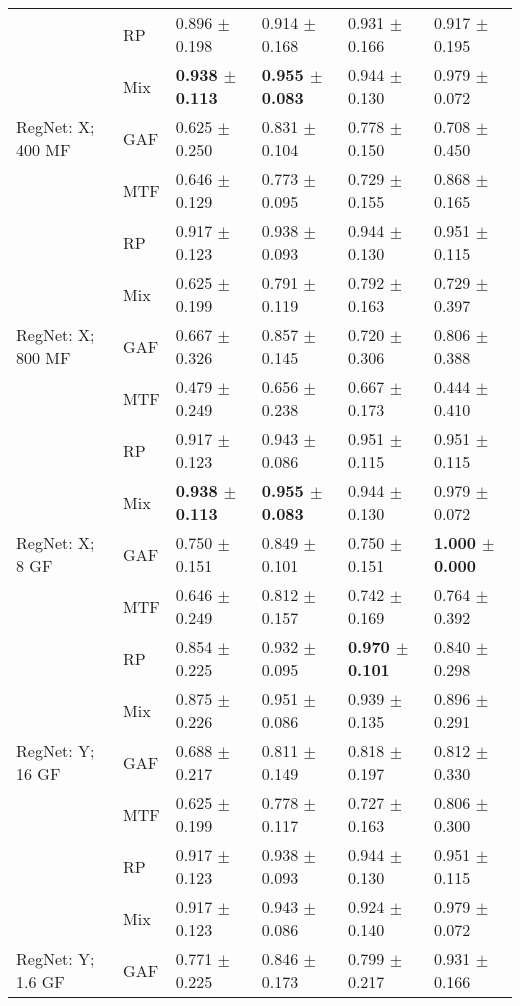 \begin{longtable}[t]{llllll}
 & RP & 0.896 $\pm$ 0.198 & 0.914 $\pm$ 0.168 & 0.931 $\pm$ 0.166 & 0.917 $\pm$ 0.195 \\
 & Mix & \textbf{0.938 $\pm$ 0.113} & \textbf{0.955 $\pm$ 0.083} & 0.944 $\pm$ 0.130 & 0.979 $\pm$ 0.072 \\
RegNet: X; 400 MF & GAF & 0.625 $\pm$ 0.250 & 0.831 $\pm$ 0.104 & 0.778 $\pm$ 0.150 & 0.708 $\pm$ 0.450 \\
 & MTF & 0.646 $\pm$ 0.129 & 0.773 $\pm$ 0.095 & 0.729 $\pm$ 0.155 & 0.868 $\pm$ 0.165 \\
 & RP & 0.917 $\pm$ 0.123 & 0.938 $\pm$ 0.093 & 0.944 $\pm$ 0.130 & 0.951 $\pm$ 0.115 \\
 & Mix & 0.625 $\pm$ 0.199 & 0.791 $\pm$ 0.119 & 0.792 $\pm$ 0.163 & 0.729 $\pm$ 0.397 \\
RegNet: X; 800 MF & GAF & 0.667 $\pm$ 0.326 & 0.857 $\pm$ 0.145 & 0.720 $\pm$ 0.306 & 0.806 $\pm$ 0.388 \\
 & MTF & 0.479 $\pm$ 0.249 & 0.656 $\pm$ 0.238 & 0.667 $\pm$ 0.173 & 0.444 $\pm$ 0.410 \\
 & RP & 0.917 $\pm$ 0.123 & 0.943 $\pm$ 0.086 & 0.951 $\pm$ 0.115 & 0.951 $\pm$ 0.115 \\
 & Mix & \textbf{0.938 $\pm$ 0.113} & \textbf{0.955 $\pm$ 0.083} & 0.944 $\pm$ 0.130 & 0.979 $\pm$ 0.072 \\
RegNet: X; 8 GF & GAF & 0.750 $\pm$ 0.151 & 0.849 $\pm$ 0.101 & 0.750 $\pm$ 0.151 & \textbf{1.000 $\pm$ 0.000} \\
 & MTF & 0.646 $\pm$ 0.249 & 0.812 $\pm$ 0.157 & 0.742 $\pm$ 0.169 & 0.764 $\pm$ 0.392 \\
 & RP & 0.854 $\pm$ 0.225 & 0.932 $\pm$ 0.095 & \textbf{0.970 $\pm$ 0.101} & 0.840 $\pm$ 0.298 \\
 & Mix & 0.875 $\pm$ 0.226 & 0.951 $\pm$ 0.086 & 0.939 $\pm$ 0.135 & 0.896 $\pm$ 0.291 \\
RegNet: Y; 16 GF & GAF & 0.688 $\pm$ 0.217 & 0.811 $\pm$ 0.149 & 0.818 $\pm$ 0.197 & 0.812 $\pm$ 0.330 \\
 & MTF & 0.625 $\pm$ 0.199 & 0.778 $\pm$ 0.117 & 0.727 $\pm$ 0.163 & 0.806 $\pm$ 0.300 \\
 & RP & 0.917 $\pm$ 0.123 & 0.938 $\pm$ 0.093 & 0.944 $\pm$ 0.130 & 0.951 $\pm$ 0.115 \\
 & Mix & 0.917 $\pm$ 0.123 & 0.943 $\pm$ 0.086 & 0.924 $\pm$ 0.140 & 0.979 $\pm$ 0.072 \\
RegNet: Y; 1.6 GF & GAF & 0.771 $\pm$ 0.225 & 0.846 $\pm$ 0.173 & 0.799 $\pm$ 0.217 & 0.931 $\pm$ 0.166 \\

\end{longtable}
